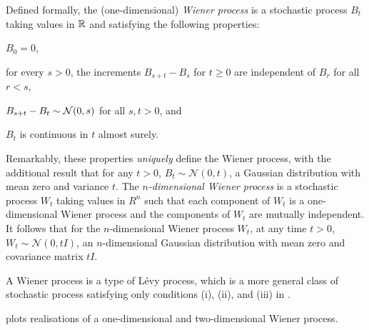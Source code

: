 Defined formally, the (one-dimensional) \emph{Wiener process} is a stochastic process \(B_t\) taking values in \(\mathbb{R}\) and satisfying the following properties:
\begin{romanate}
	\item \(B_0 = 0\),
	\item for every \(s > 0\), the increments \(B_{s + t} - B_{s}\) for \(t \geq 0\) are independent of \(B_r\) for all \(r < s\),
	\item \(B_{s + t} - B_t \sim\mathcal{N}\!\left(0, s\right)\) for all \(s,t > 0\), and
	\item \(B_t\) is continuous in \(t\) almost surely.
\end{romanate}
Remarkably, these properties \emph{uniquely} define the Wiener process, with the additional result that for any \(t > 0\), \(B_t \sim \mathcal{N}\left(0, t\right)\), a Gaussian distribution with mean zero and variance \(t\).
The \emph{\(n\)-dimensional Wiener process} is a stochastic process \(W_t\) taking values in \(R^n\) such that each component of \(W_t\) is a one-dimensional Wiener process and the components of \(W_t\) are mutually independent.
It follows that for the \(n\)-dimensional Wiener process \(W_t\), at any time \(t > 0\), \(W_t \sim \mathcal{N}\left(0, tI\right)\), an \(n\)-dimensional Gaussian distribution with mean zero and covariance matrix \(tI\).

A Wiener process is a type of L\'evy process, which is a more general class of stochastic process satisfying only conditions (i), (ii), and (iii) in  \citep{Applebaum_2004_LevyProcessesStochastic}.

 plots realisations of a one-dimensional and two-dimensional Wiener process.

